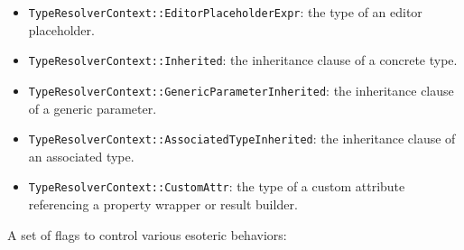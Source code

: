 \documentclass[../generics]{subfiles}
\begin{document}
\begin{itemize}
\item \texttt{TypeResolverContext::EditorPlaceholderExpr}: the type of an editor placeholder.
\item \texttt{TypeResolverContext::Inherited}: the inheritance clause of a concrete type.
\item \texttt{TypeResolverContext::GenericParameterInherited}: the inheritance clause of a generic parameter.
\item \texttt{TypeResolverContext::AssociatedTypeInherited}: the inheritance clause of an associated type.
\item \texttt{TypeResolverContext::CustomAttr}: the type of a custom attribute referencing a property wrapper or result builder.
\end{itemize}

A set of flags to control various esoteric behaviors:
\end{document}
